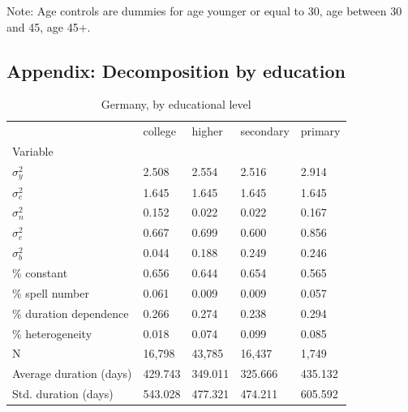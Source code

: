 \documentclass[12pt]{article}
\theoremstyle{definition}
\theoremstyle{remark}
\begin{document}
\begin{appendices}
Note: Age controls are dummies for age younger or equal to 30, age between 30 and 45, age 45+.




\clearpage


\subsection{Appendix: Decomposition by education}
\begin{table}[htbb!]
    \centering
    \caption{Germany, by educational level}
\begin{tabular}{lllll}
\toprule
 & college & higher & secondary & primary \\
Variable &  &  &  &  \\
\midrule
$\sigma^{2}_y$ & 2.508 & 2.554 & 2.516 & 2.914 \\
$\sigma^{2}_c$ & 1.645 & 1.645 & 1.645 & 1.645 \\
$\sigma^{2}_n$ & 0.152 & 0.022 & 0.022 & 0.167 \\
$\sigma^{2}_e$ & 0.667 & 0.699 & 0.600 & 0.856 \\
$\sigma^{2}_b$ & 0.044 & 0.188 & 0.249 & 0.246 \\
\midrule
\% constant & 0.656 & 0.644 & 0.654 & 0.565 \\
\% spell number & 0.061 & 0.009 & 0.009 & 0.057 \\
\% duration dependence & 0.266 & 0.274 & 0.238 & 0.294 \\
\% heterogeneity & 0.018 & 0.074 & 0.099 & 0.085 \\
\hline \hline
N & 16,798 & 43,785 & 16,437 & 1,749 \\
Average duration (days) & 429.743 & 349.011 & 325.666 & 435.132 \\
Std. duration (days) & 543.028 & 477.321 & 474.211 & 605.592 \\
\bottomrule
\end{tabular}
\end{table}


\end{appendices}
\end{document}
